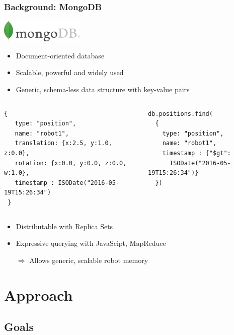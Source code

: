 \begin{frame}[fragile]
  \frametitle{Background: MongoDB}
  \includegraphics[width=0.3\textwidth]{../img/mongodb}
  \begin{itemize}
    \item Document-oriented database
    \item Scalable, powerful and widely used
    \item Generic, schema-less data structure with key-value pairs
  \end{itemize}
\begin{columns}
\begin{lstlisting}[style=ReallySmallJSON,
  framexleftmargin=2pt, xleftmargin=2pt,
 morekeywords={}, numbers=none]
 {
   type: "position",
   name: "robot1",
   translation: {x:2.5, y:1.0, z:0.0},
   rotation: {x:0.0, y:0.0, z:0.0, w:1.0},
   timestamp : ISODate("2016-05-19T15:26:34")
 }
\end{lstlisting}
\begin{lstlisting}[style=ReallySmallJSON,
  framexleftmargin=2pt, xleftmargin=10pt,
 morekeywords={}, numbers=none]
db.positions.find(
  {
    type: "position",
    name: "robot1",
    timestamp : {"$gt":
      ISODate("2016-05-19T15:26:34")}
  })
\end{lstlisting}
\end{columns}

  \begin{itemize}
    \item Distributable with Replica Sets
    \item Expressive querying with JavaScipt, MapReduce
    \item[$\Rightarrow$] Allows generic, scalable robot memory
  \end{itemize}
\end{frame}


\section{Approach}
\subsection{Goals}

